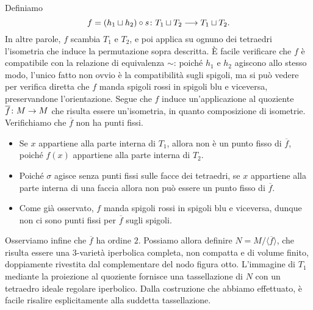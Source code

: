 Definiamo
\[
\map{f=(h_1\sqcup h_2)\circ s}{T_1\sqcup T_2}{T_1\sqcup T_2.}
\]
In altre parole, $f$ scambia $T_1$ e $T_2$, e poi applica su ognuno dei tetraedri l'isometria che induce la permutazione sopra descritta. È facile verificare che $f$ è compatibile con la relazione di equivalenza $\sim$: poiché $h_1$ e $h_2$ agiscono allo stesso modo, l'unico fatto non ovvio è la compatibilità sugli spigoli, ma si può vedere per verifica diretta che $f$ manda spigoli rossi in spigoli blu e viceversa, preservandone l'orientazione.
Segue che $f$ induce un'applicazione al quoziente $\map{\overline{f}}{M}{M}$ che risulta essere un'isometria, in quanto composizione di isometrie. Verifichiamo che $\overline{f}$ non ha punti fissi.
\begin{itemize}
\item Se $x$ appartiene alla parte interna di $T_1$, allora non è un punto fisso di $\overline{f}$, poiché $f(x)$ appartiene alla parte interna di $T_2$.
\item Poiché $\sigma$ agisce senza punti fissi sulle facce dei tetraedri, se $x$ appartiene alla parte interna di una faccia allora non può essere un punto fisso di $\overline{f}$.
\item Come già osservato, $f$ manda spigoli rossi in spigoli blu e viceversa, dunque non ci sono punti fissi per $\overline{f}$ sugli spigoli.
\end{itemize}
Osserviamo infine che $\overline{f}$ ha ordine $2$. Possiamo allora definire $N=M/\langle\overline{f}\rangle$, che risulta essere una $3$-varietà iperbolica completa, non compatta e di volume finito, doppiamente rivestita dal complementare del nodo figura otto. L'immagine di $T_1$ mediante la proiezione al quoziente fornisce una tassellazione di $N$ con un tetraedro ideale regolare iperbolico. Dalla costruzione che abbiamo effettuato, è facile risalire esplicitamente alla suddetta tassellazione.